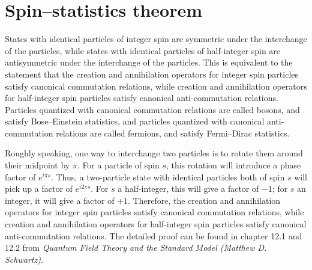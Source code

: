 \section{Spin--statistics theorem}
\begin{newthem}
States with identical particles of integer spin are symmetric under the interchange of the particles, while states with identical particles of half-integer spin are antisymmetric under the interchange of the particles.
This is equivalent to the statement that the creation and annihilation operators for integer spin particles satisfy canonical commutation relations, while creation and annihilation operators for half-integer spin particles satisfy canonical anti-commutation relations.
Particles quantized with canonical commutation relations are called bosons, and satisfy Bose--Einstein statistics, and particles quantized with canonical anti-commutation relations are called fermions, and satisfy Fermi--Dirac statistics.
\end{newthem}

\noindent
Roughly speaking,  one way to interchange two particles is to rotate them around their midpoint by $\pi$. For a particle of spin $s$, this rotation will introduce a phase factor of $e^{i\pi s}$. Thus, a two-particle state with identical particles both of spin $s$ will pick up a factor of $e^{i2\pi s}$. For $s$ a half-integer, this will give a factor of $-1$; for $s$ an integer, it will give a factor of $+1$. Therefore, the creation and annihilation operators for integer spin particles satisfy canonical commutation relations, while creation and annihilation operators for half-integer spin particles satisfy canonical anti-commutation relations. The detailed proof can be found in chapter 12.1 and 12.2 from \emph{Quantum Field Theory and the Standard Model (Matthew D. Schwartz)}.

